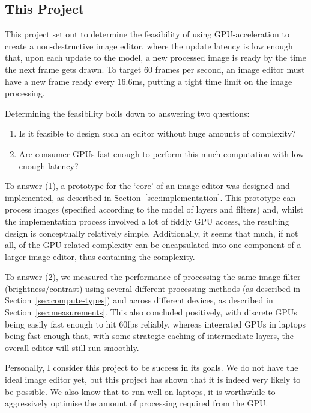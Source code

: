 \documentclass[12pt]{article}
\begin{document}
\subsection{This Project}

This project set out to determine the feasibility of using GPU-acceleration to create a
non-destructive image editor, where the update latency is low enough that, upon each update to the
model, a new processed image is ready by the time the next frame gets drawn.  To target 60 frames
per second, an image editor must have a new frame ready every 16.6ms, putting a tight time limit on
the image processing.

Determining the feasibility boils down to answering two questions:

\begin{enumerate}
    \item Is it feasible to design such an editor without huge amounts of complexity?
    \item Are consumer GPUs fast enough to perform this much computation with low enough latency?
\end{enumerate}

To answer (1), a prototype for the `core' of an image editor was designed and implemented, as
described in Section~\ref{sec:implementation}.  This prototype can process images (specified
according to the model of layers and filters) and, whilst the implementation process involved a lot
of fiddly GPU access, the resulting design is conceptually relatively simple.  Additionally, it
seems that much, if not all, of the GPU-related complexity can be encapsulated into one component of
a larger image editor, thus containing the complexity.

To answer (2), we measured the performance of processing the same image filter (brightness/contrast)
using several different processing methods (as described in Section~\ref{sec:compute-types}) and
across different devices, as described in Section~\ref{sec:measurements}.  This also concluded
positively, with discrete GPUs being easily fast enough to hit 60fps reliably, whereas integrated
GPUs in laptops being fast enough that, with some strategic caching of intermediate layers, the
overall editor will still run smoothly.

Personally, I consider this project to be success in its goals.  We do not have the ideal image
editor yet, but this project has shown that it is indeed very likely to be possible.  We also know
that to run well on laptops, it is worthwhile to aggressively optimise the amount of processing
required from the GPU.
\end{document}
